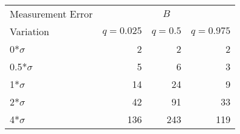 
\begin{tabular}{lrrr}
\toprule
\multicolumn{1}{c}{Measurement Error} & \multicolumn{3}{c}{$B$} \\
Variation & $q = 0.025$ & $q = 0.5$ & $q = 0.975$\\
\midrule
0*$\sigma$ & 2 & 2 & 2\\
0.5*$\sigma$ & 5 & 6 & 3\\
1*$\sigma$ & 14 & 24 & 9\\
2*$\sigma$ & 42 & 91 & 33\\
4*$\sigma$ & 136 & 243 & 119\\
\bottomrule
\end{tabular}
